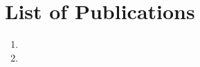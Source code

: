 \nobibliography*
%
  \section*{List of Publications}
  \begin{enumerate}
    \item {}
    \item {}
  \end{enumerate}
\begin{flushright}
\end{flushright}

